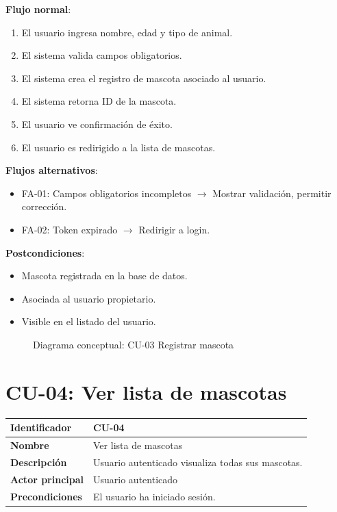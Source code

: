 \documentclass[12pt,a4paper]{article}
\begin{document}
\vspace{0.5em}

\textbf{Flujo normal}:
\begin{enumerate}[leftmargin=*]
    \item El usuario ingresa nombre, edad y tipo de animal.
    \item El sistema valida campos obligatorios.
    \item El sistema crea el registro de mascota asociado al usuario.
    \item El sistema retorna ID de la mascota.
    \item El usuario ve confirmaci\'on de \'exito.
    \item El usuario es redirigido a la lista de mascotas.
\end{enumerate}

\textbf{Flujos alternativos}:
\begin{itemize}[leftmargin=*]
    \item FA-01: Campos obligatorios incompletos $\rightarrow$ Mostrar validaci\'on, permitir correcci\'on.
    \item FA-02: Token expirado $\rightarrow$ Redirigir a login.
\end{itemize}

\textbf{Postcondiciones}:
\begin{itemize}[leftmargin=*]
    \item Mascota registrada en la base de datos.
    \item Asociada al usuario propietario.
    \item Visible en el listado del usuario.
\end{itemize}

\begin{figure}[h]
\centering
{}
\caption{Diagrama conceptual: CU-03 Registrar mascota}
\end{figure}

\newpage

\section{CU-04: Ver lista de mascotas}

\begin{tabular}{|p{3.5cm}|p{10cm}|}
\hline
\textbf{Identificador} & CU-04 \\
\hline
\textbf{Nombre} & Ver lista de mascotas \\
\hline
\textbf{Descripci\'on} & Usuario autenticado visualiza todas sus mascotas. \\
\hline
\textbf{Actor principal} & Usuario autenticado \\
\hline
\textbf{Precondiciones} & El usuario ha iniciado sesi\'on. \\
\hline
\end{tabular}
\end{document}
